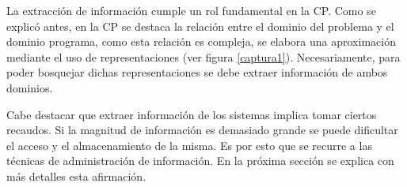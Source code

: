 \documentclass[a4paper,12pt]{report}
\begin{document}
La extracción de información cumple un rol fundamental en la CP. Como se explicó antes, en la CP se destaca la relación entre el dominio del problema y el dominio programa, como esta relación es compleja, se elabora una aproximación mediante el uso de representaciones (ver figura \ref{captura1}). Necesariamente, para poder bosquejar dichas representaciones se debe extraer información de ambos dominios.

Cabe destacar que extraer información de los sistemas implica tomar ciertos recaudos. Si la magnitud de información es demasiado grande se puede dificultar el acceso y el almacenamiento de la misma. Es por esto que se recurre a las técnicas de administración de información. En la próxima sección se explica con más detalles esta afirmación.





\end{document}
